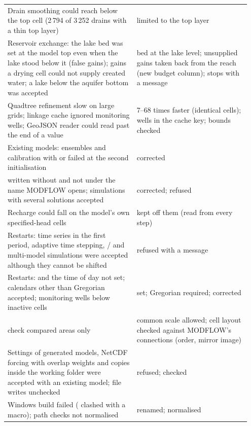 \begin{longtable}{P{0.508\linewidth}P{0.44\linewidth}}
Drain smoothing could reach below the top cell (2\,794 of 3\,252 drains with a thin top layer) & limited to the top layer\\
Reservoir exchange: the lake bed was set at the model top even when the lake stood below it (false gains); gains a drying cell could not supply created water; a lake below the aquifer bottom was accepted & bed at the lake level; unsupplied gains taken back from the reach (new budget column); stops with a message\\
Quadtree refinement slow on large grids; linkage cache ignored monitoring wells; GeoJSON reader could read past the end of a value & 7--68 times faster (identical cells); wells in the cache key; bounds checked\\
Existing models: ensembles and calibration with  or  failed at the second initialisation & corrected\\
 written without  and not under the name MODFLOW opens; simulations with several solutions accepted & corrected; refused\\
Recharge could fall on the model's own specified-head cells & kept off them (read from  every step)\\
Restarts: time series in the first period, adaptive time stepping, / and multi-model simulations were accepted although they cannot be shifted & refused with a message\\
Restarts:  and the time of day not set; calendars other than Gregorian accepted; monitoring wells below inactive cells & set; Gregorian required; corrected\\
 check compared areas only & common scale allowed; cell layout checked against MODFLOW's connections (order, mirror image)\\
Settings of generated models, NetCDF forcing with overlap weights and copies inside the working folder were accepted with an existing model; file writes unchecked & refused; checked\\
Windows build failed ( clashed with a  macro); path checks not normalised & renamed; normalised\\
\end{longtable}
